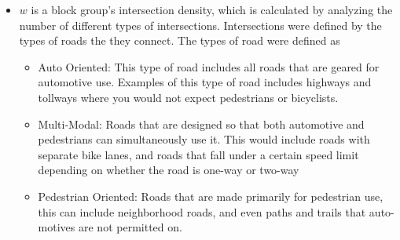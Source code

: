 \documentclass[
]{article}
\begin{document}
\begin{itemize}
\item
  \(w\) is a block group's intersection density, which is calculated by
  analyzing the number of different types of intersections.
  Intersections were defined by the types of roads the they connect. The
  types of road were defined as

  \begin{itemize}
  \item
    Auto Oriented: This type of road includes all roads that are geared
    for automotive use. Examples of this type of road includes highways
    and tollways where you would not expect pedestrians or bicyclists.
  \item
    Multi-Modal: Roads that are designed so that both automotive and
    pedestrians can simultaneously use it. This would include roads with
    separate bike lanes, and roads that fall under a certain speed limit
    depending on whether the road is one-way or two-way
  \item
    Pedestrian Oriented: Roads that are made primarily for pedestrian
    use, this can include neighborhood roads, and even paths and trails
    that auto-motives are not permitted on.
  \end{itemize}


\end{itemize}
\end{document}
